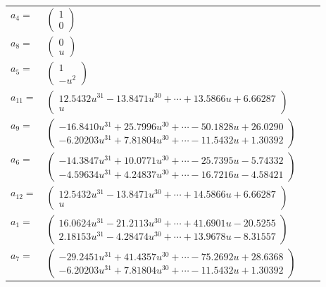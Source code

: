 \documentclass[1p]{elsarticle_modified}
\theoremstyle{definition}
\begin{document}
\begin{tabular}{m{7pt} m{180pt} m{7pt} m{180pt} }
\flushright $a_{4}=$&$\begin{pmatrix}1\\0\end{pmatrix}$ \\
\flushright $a_{8}=$&$\begin{pmatrix}0\\u\end{pmatrix}$ \\
\flushright $a_{5}=$&$\begin{pmatrix}1\\- u^2\end{pmatrix}$ \\
\flushright $a_{11}=$&$\begin{pmatrix}12.5432 u^{31}-13.8471 u^{30}+\cdots+13.5866 u+6.66287\\u\end{pmatrix}$ \\
\flushright $a_{9}=$&$\begin{pmatrix}-16.8410 u^{31}+25.7996 u^{30}+\cdots-50.1828 u+26.0290\\-6.20203 u^{31}+7.81804 u^{30}+\cdots-11.5432 u+1.30392\end{pmatrix}$ \\
\flushright $a_{6}=$&$\begin{pmatrix}-14.3847 u^{31}+10.0771 u^{30}+\cdots-25.7395 u-5.74332\\-4.59634 u^{31}+4.24837 u^{30}+\cdots-16.7216 u-4.58421\end{pmatrix}$ \\
\flushright $a_{12}=$&$\begin{pmatrix}12.5432 u^{31}-13.8471 u^{30}+\cdots+14.5866 u+6.66287\\u\end{pmatrix}$ \\
\flushright $a_{1}=$&$\begin{pmatrix}16.0624 u^{31}-21.2113 u^{30}+\cdots+41.6901 u-20.5255\\2.18153 u^{31}-4.28474 u^{30}+\cdots+13.9678 u-8.31557\end{pmatrix}$ \\
\flushright $a_{7}=$&$\begin{pmatrix}-29.2451 u^{31}+41.4357 u^{30}+\cdots-75.2692 u+28.6368\\-6.20203 u^{31}+7.81804 u^{30}+\cdots-11.5432 u+1.30392\end{pmatrix}$ \\

\end{tabular}
\end{document}
